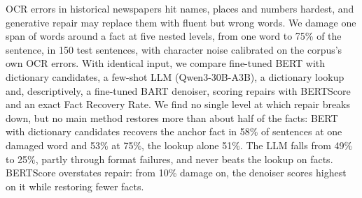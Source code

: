 OCR errors in historical newspapers hit names, places and numbers hardest, and generative repair may replace them
with fluent but wrong words. We damage one span of words around a fact at five nested levels, from one word to 75\%
of the sentence, in 150 \bln{} test sentences, with character noise calibrated on the corpus's own OCR errors. With
identical input, we compare fine-tuned BERT with dictionary candidates, a few-shot LLM (Qwen3-30B-A3B), a dictionary
lookup and, descriptively, a fine-tuned BART denoiser, scoring repairs with BERTScore and an exact Fact Recovery
Rate. We find no single level at which repair breaks down, but no main method restores more than about half of the facts: BERT with
dictionary candidates recovers the anchor fact in 58\% of sentences at one damaged word and 53\% at 75\%, the lookup
alone 51\%. The LLM falls from 49\% to 25\%, partly through format failures, and never beats the lookup on facts.
BERTScore overstates repair: from 10\% damage on, the denoiser scores highest on it while restoring fewer facts.
